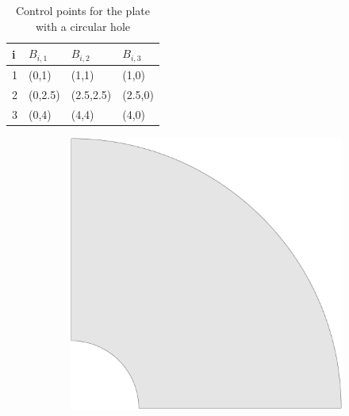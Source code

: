 \documentclass{article}
\begin{document}
\begin{table}
\begin{center}
\caption{Control points for the plate with a circular hole}\label{table:control_points}
\begin{tabular}{l@{\hskip 1cm}l@{\hskip 1cm}l@{\hskip 1cm}l}
\hline
i    & $B_{i,1} $ & $B_{i,2}$ & $B_{i,3}$\\
\hline
1    & (0,1)    & (1,1)     & (1,0)   \\
2    & (0,2.5)  & (2.5,2.5) & (2.5,0) \\
3    & (0,4)    & (4,4)     & (4,0)   \\
\hline
\end{tabular}
\end{center}
\end{table}
\begin{figure}
    \centering
    \begin{subfigure}[b]{0.18\linewidth}        %
        \centering
        \includegraphics[width=\linewidth]{mesh_hole_0}
    \end{subfigure}
    \begin{subfigure}[b]{0.18\linewidth}        %
        \centering

\end{subfigure}
\end{figure}
\end{document}

